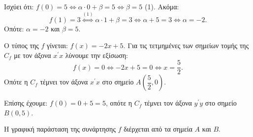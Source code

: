 
\begin{alist}
\item Ισχύει ότι:
$f(0) = 5 \Leftrightarrow \alpha \cdot 0 + \beta = 5 \Leftrightarrow \beta = 5$ (1).
Ακόμα:
\[f(1) = 3 \overset{(1)}{\Leftrightarrow} \alpha \cdot 1 + \beta = 3 \Leftrightarrow \alpha + 5 = 3 \Leftrightarrow \alpha = -2.\]
Οπότε: $\alpha = -2$ και $\beta = 5$.

\item Ο τύπος της $f$ γίνεται: $f(x) = -2x + 5$.
Για τις τετμημένες των σημείων τομής της $C_f$ με τον άξονα $x^\prime x$ λύνουμε την εξίσωση:
\[f(x) = 0 \Leftrightarrow -2x + 5 = 0 \Leftrightarrow x = \dfrac{5}{2}.\]
Οπότε η $C_f$ τέμνει τον άξονα $x^\prime x$ στο σημείο $A\left(\dfrac{5}{2}, 0\right)$.

Επίσης έχουμε: $f(0) = 0 + 5 = 5$, οπότε η $C_f$ τέμνει τον άξονα $y^\prime y$ στο σημείο $B(0, 5)$.

\item Η γραφική παράσταση της συνάρτησης $f$ διέρχεται από τα σημεία $A$ και $B$.
\end{alist}

